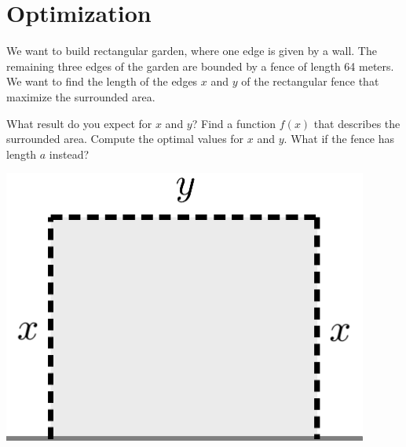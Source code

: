 \section{Optimization} \label{sec:factorial}
\begin{exercise}
	We want to build rectangular garden, where one edge is given by a wall.
	The remaining three edges of the garden are bounded by a fence of length 64 meters.
	We want to find the length of the edges $x$ and $y$ of the rectangular fence that maximize the surrounded area.\\
\begin{minipage}{0.66\textwidth}
	\begin{tasks}
		\task What result do you expect for $x$ and $y$?
		\task Find a function $f(x)$ that describes the surrounded area.
		\task Compute the optimal values for $x$ and $y$.
		\task What if the fence has length $a$ instead?
	\end{tasks}
\end{minipage}\hfill
\begin{minipage}{0.33\textwidth}
	\includegraphics[width=0.9\textwidth]{images/fence}
\end{minipage}
\end{exercise}
